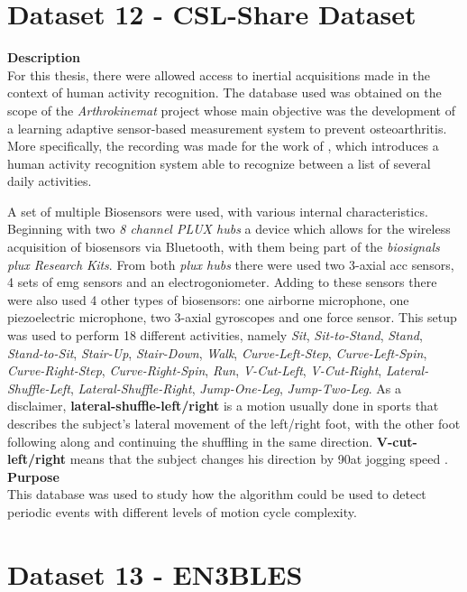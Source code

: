 \section{Dataset 12 - CSL-Share Dataset}
\label{dat:dataset12}
\textbf{Description} \hfill \\
For this thesis, there were allowed access to inertial acquisitions made in the context of human activity recognition. The database used was obtained on the scope of the \textit{Arthrokinemat} project whose main objective was the development of a learning adaptive sensor-based measurement system to prevent osteoarthritis\cite{arthrokinemat}. More specifically, the recording was made for the work of \cite{Liu2019}, which introduces a human activity recognition system able to recognize between a list of several daily activities.
\par
A set of multiple Biosensors were used, with various internal characteristics. Beginning with two \textit{8 channel PLUX hubs} a device which allows for the wireless acquisition of biosensors via Bluetooth, with them being part of the \textit{biosignals plux Research Kits}. From both \textit{plux hubs} there were used two 3-axial \gls{acc} sensors, 4 sets of \gls{emg} sensors and an electrogoniometer. Adding to these sensors there were also used 4 other types of biosensors: one airborne microphone, one piezoelectric microphone, two 3-axial gyroscopes and one force sensor. This setup was used to perform 18 different activities, namely \textit{Sit}, \textit{Sit-to-Stand}, \textit{Stand}, \textit{Stand-to-Sit}, \textit{Stair-Up}, \textit{Stair-Down}, \textit{Walk}, \textit{Curve-Left-Step}, \textit{Curve-Left-Spin}, \textit{Curve-Right-Step}, \textit{Curve-Right-Spin}, \textit{Run}, \textit{V-Cut-Left}, \textit{V-Cut-Right}, \textit{Lateral-Shuffle-Left}, \textit{Lateral-Shuffle-Right}, \textit{Jump-One-Leg}, \textit{Jump-Two-Leg}. As a disclaimer, \textbf{lateral-shuffle-left/right} is a motion usually done in sports that describes the subject's lateral movement of the left/right foot, with the other foot following along and continuing the shuffling in the same direction. \textbf{V-cut-left/right} means that the subject changes his direction by 90\degree at jogging speed \cite{dataset_hui}.\\
\textbf{Purpose}\hfill \\
This database was used to study how the algorithm could be used to detect periodic events with different levels of motion cycle complexity.

\section{Dataset 13 - EN3BLES}
\label{dat:dataset13}

